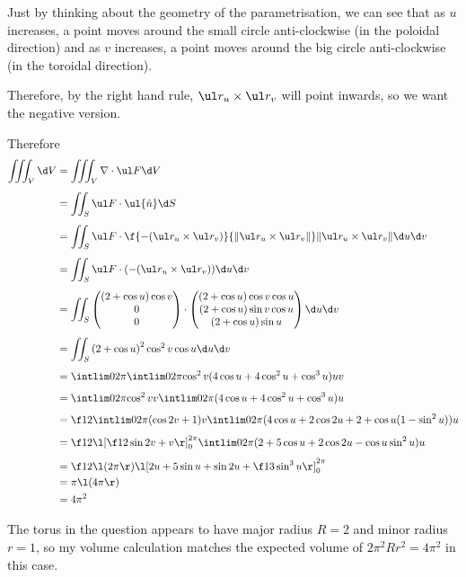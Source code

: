 \documentclass[a4paper]{article}
\begin{document}
Just by thinking about the geometry of the parametrisation, we can see that as $u$ increases, a point moves around the small circle anti-clockwise (in the poloidal direction) and as $v$ increases, a point moves around the big circle anti-clockwise (in the toroidal direction).

Therefore, by the right hand rule, $\ul r_u \times \ul r_v$ will point inwards, so we want the negative version.

Therefore \begin{align*}
\iiint_V \d V &= \iiint_V \nabla \cdot \ul F \d V \\[1ex]
&= \iint_S \ul F \cdot \ul{\hat n} \d S \\[1ex]
&= \iint_S \ul F \cdot \f{-(\ul r_u \times \ul r_v)}{\| \ul r_u \times \ul r_v \|} \| \ul r_u \times \ul r_v \| \d u \d v \\[1ex]
&= \iint_S \ul F \cdot (-(\ul r_u \times \ul r_v)) \d u \d v \\[1ex]
&= \iint_S \begin{pmatrix} (2 + \cos u) \cos v \\ 0 \\ 0 \end{pmatrix} \cdot \begin{pmatrix} (2 + \cos u) \cos v \cos u \\ (2 + \cos u) \sin v \cos u \\ (2 + \cos u) \sin u \end{pmatrix} \d u \d v \\[1ex]
&= \iint_S {(2 + \cos u)}^2 \cos^2 v \cos u \d u \d v \\[1ex]
&= \intlim 0{2\pi} {\intlim 0{2\pi} {\cos^2 v (4 \cos u + 4 \cos^2 u + \cos^3 u)} u} v \\[1ex]
&= \intlim 0{2\pi} {\cos^2 v} v \intlim 0{2\pi} {(4 \cos u + 4 \cos^2 u + \cos^3 u)} u \\[1ex]
&= \f12 \intlim 0{2\pi} {(\cos 2v + 1)} v \intlim 0{2\pi} {(4 \cos u + 2 \cos 2u + 2 + \cos u (1 - \sin^2 u))} u \\[1ex]
&= \f12 {\l[ \f12 \sin 2v + v \r]}_0^{2\pi} \intlim 0{2\pi} {(2 + 5 \cos u + 2 \cos 2u - \cos u \sin^2 u)} u \\[1ex]
&= \f12 \l( 2 \pi \r) {\l[ 2u + 5 \sin u + \sin 2u + \f13 \sin^3 u \r]}_0^{2\pi} \\
&= \pi \l( 4\pi \r) \\
&= 4 \pi^2
\end{align*}

The torus in the question appears to have major radius $R=2$ and minor radius $r=1$, so my volume calculation matches the expected volume of $2\pi^2 R r^2 = 4\pi^2$ in this case.

\end{document}
